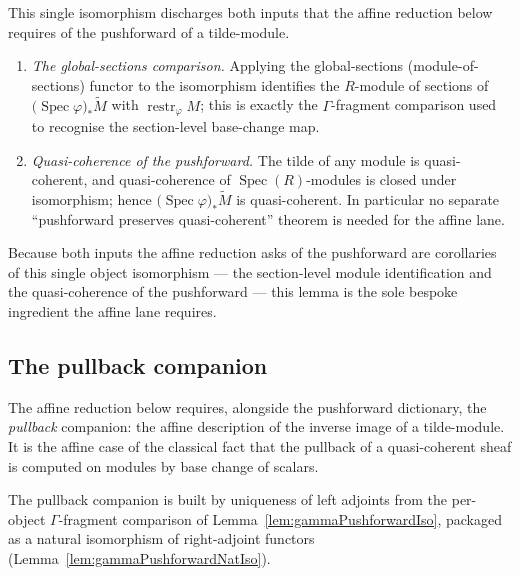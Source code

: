 \begin{remark}
  This single isomorphism discharges both inputs that the affine reduction below
  requires of the pushforward of a tilde-module.
  \begin{enumerate}
    \item \emph{The global-sections comparison.} Applying the global-sections
      (module-of-sections) functor to the isomorphism identifies the
      \(R\)-module of sections of
      \(\bigl(\operatorname{Spec}\varphi\bigr)_*\widetilde{M}\) with
      \(\operatorname{restr}_\varphi M\); this is exactly the \(\Gamma\)-fragment
      comparison used to recognise the section-level base-change map.
    \item \emph{Quasi-coherence of the pushforward.} The tilde of any module is
      quasi-coherent, and quasi-coherence of \(\operatorname{Spec}(R)\)-modules is
      closed under isomorphism; hence
      \(\bigl(\operatorname{Spec}\varphi\bigr)_*\widetilde{M}\) is quasi-coherent.
      In particular no separate ``pushforward preserves quasi-coherent'' theorem is
      needed for the affine lane.
  \end{enumerate}
  Because both inputs the affine reduction asks of the pushforward are corollaries
  of this single object isomorphism — the section-level module identification and
  the quasi-coherence of the pushforward — this lemma is the sole bespoke
  ingredient the affine lane requires.
\end{remark}

\subsection{The pullback companion}

The affine reduction below requires, alongside the pushforward dictionary, the
\emph{pullback} companion: the affine description of the inverse image of a
tilde-module. It is the affine case of the classical fact that the pullback of a
quasi-coherent sheaf is computed on modules by base change of scalars.

The pullback companion is built by uniqueness of left adjoints from the
per-object \(\Gamma\)-fragment comparison of
Lemma~\ref{lem:gammaPushforwardIso}, packaged as a natural isomorphism of
right-adjoint functors (Lemma~\ref{lem:gammaPushforwardNatIso}).



